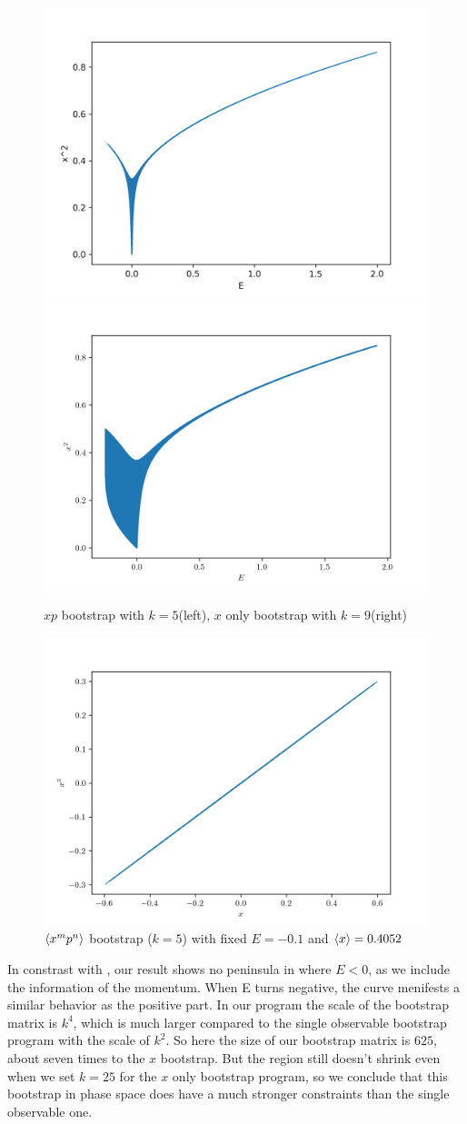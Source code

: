\documentclass[aps,prl, preprint,amsmath, amssymb]{revtex4-2}
\begin{document}
\begin{figure}
    \includegraphics[width=0.45\linewidth]{plot_5.png}
    \includegraphics[width=0.45\linewidth]{x_9.png}
    \caption{$xp$ bootstrap with $k = 5$(left), $x$ only bootstrap with $k = 9$(right)}
    \label{fig:doublewell}
\end{figure}

\begin{figure}
    \includegraphics[width=0.8\linewidth]{13.png}
    \caption{$\braket{x^m p^n}$ bootstrap ($k = 5$) with fixed $E = -0.1$ and $\braket{x} = 0.4052$}
    \label{fig:xx}
\end{figure}


In constrast with \cite{Nakayama_2022}, our result shows no peninsula in where $E < 0$, as we include the information of the momentum. When E turns negative, the curve menifests a similar behavior as the positive part. In our program the scale of the bootstrap matrix is $k^4$, which is much larger compared to the single observable bootstrap program with the scale of $k^2$. So here the size of our bootstrap matrix is $625$, about seven times to the $x$ bootstrap. But the region still doesn't shrink even when we set $k = 25$ for the $x$ only bootstrap program, so we conclude that this bootstrap in phase space does have a much stronger constraints than the single observable one.
\end{document}
